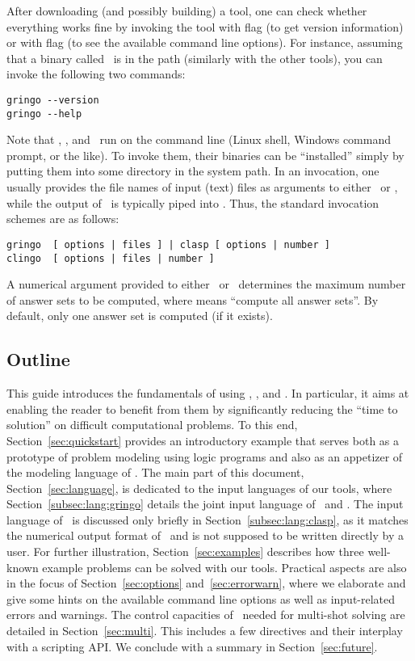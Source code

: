 After downloading (and possibly building) a tool,
one can check whether every\-thing works fine by invoking the tool
with flag  (to get version information) or
with flag  (to see the available command line options).
For instance, assuming that a binary called \gringo\ is in the path
(similarly with the other tools),
you can invoke the following two commands:
%
\begin{lstlisting}[numbers=none]
gringo --version
gringo --help
\end{lstlisting}

Note that \gringo, \clasp, and \clingo\ 
run on the command line (Linux shell, Windows command prompt, or the like).
To invoke them, their binaries can be ``installed''
simply by putting them into some directory in the system path.
In an invocation,
one usually provides the file names of input (text) files 
as arguments to either \gringo\ or \clingo,
while the output of \gringo\ is typically piped into \clasp.
Thus, the standard invocation schemes are as follows:
\begin{lstlisting}[numbers=none]
gringo  [ options | files ] | clasp [ options | number ]
clingo  [ options | files | number ]
\end{lstlisting}
A numerical argument provided to either \clasp\ or \clingo\
determines the maximum number of answer sets to be computed,
where \code{0} means ``compute all answer sets''.
By default, only one answer set is computed (if it exists).

\subsection{Outline}

This guide introduces the fundamentals of using
\gringo, \clasp, and \clingo.
In particular, it aims at enabling the reader to benefit from them
by significantly reducing the ``time to solution'' on difficult computational problems.
To this end,
Section~\ref{sec:quickstart}
provides an introductory example 
that serves both as a prototype of problem modeling using logic programs
and also as an appetizer of the modeling language of \gringo.
The main part of this document, Section~\ref{sec:language},
is dedicated to the input languages of our tools,
where Section~\ref{subsec:lang:gringo}
details the joint input language of \gringo\ and \clingo.
The input language of \clasp\ is discussed only briefly in Section~\ref{subsec:lang:clasp},
as it matches the numerical output format of \gringo\ and
is not supposed to be written directly by a user.
For %
further illustration,
Section~\ref{sec:examples} describes how three well-known example problems
can be solved with our tools.
Practical aspects are also in the focus of Section~\ref{sec:options} and~\ref{sec:errorwarn},
where we elaborate and give some hints on the available command line options
as well as input-related errors and warnings. %
The control capacities of \clingo\ needed for multi-shot solving are detailed in Section~\ref{sec:multi}.
This includes a few directives and their interplay with a scripting API.
We conclude with a summary in Section~\ref{sec:future}.

